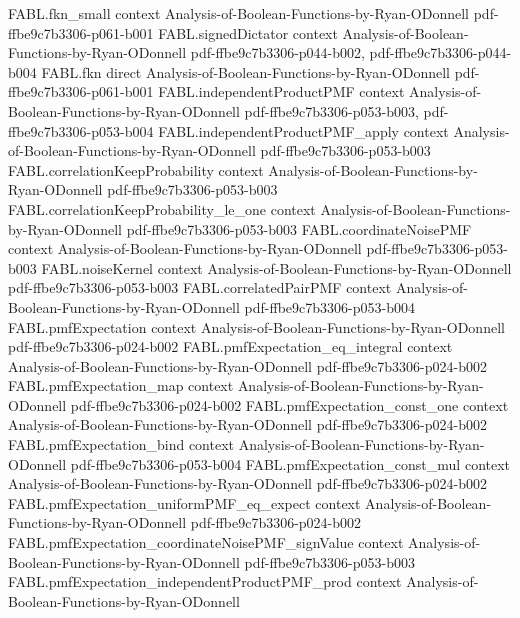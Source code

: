 \begin{theorem}
\proofstep
  {FABL.fkn_small}
  {context}
  {Analysis-of-Boolean-Functions-by-Ryan-ODonnell}
  {pdf-ffbe9c7b3306-p061-b001}
\proofstep
  {FABL.signedDictator}
  {context}
  {Analysis-of-Boolean-Functions-by-Ryan-ODonnell}
  {pdf-ffbe9c7b3306-p044-b002,
    pdf-ffbe9c7b3306-p044-b004}
\proofstep
  {FABL.fkn}
  {direct}
  {Analysis-of-Boolean-Functions-by-Ryan-ODonnell}
  {pdf-ffbe9c7b3306-p061-b001}
\proofstep
  {FABL.independentProductPMF}
  {context}
  {Analysis-of-Boolean-Functions-by-Ryan-ODonnell}
  {pdf-ffbe9c7b3306-p053-b003,
    pdf-ffbe9c7b3306-p053-b004}
\proofstep
  {FABL.independentProductPMF_apply}
  {context}
  {Analysis-of-Boolean-Functions-by-Ryan-ODonnell}
  {pdf-ffbe9c7b3306-p053-b003}
\proofstep
  {FABL.correlationKeepProbability}
  {context}
  {Analysis-of-Boolean-Functions-by-Ryan-ODonnell}
  {pdf-ffbe9c7b3306-p053-b003}
\proofstep
  {FABL.correlationKeepProbability_le_one}
  {context}
  {Analysis-of-Boolean-Functions-by-Ryan-ODonnell}
  {pdf-ffbe9c7b3306-p053-b003}
\proofstep
  {FABL.coordinateNoisePMF}
  {context}
  {Analysis-of-Boolean-Functions-by-Ryan-ODonnell}
  {pdf-ffbe9c7b3306-p053-b003}
\proofstep
  {FABL.noiseKernel}
  {context}
  {Analysis-of-Boolean-Functions-by-Ryan-ODonnell}
  {pdf-ffbe9c7b3306-p053-b003}
\proofstep
  {FABL.correlatedPairPMF}
  {context}
  {Analysis-of-Boolean-Functions-by-Ryan-ODonnell}
  {pdf-ffbe9c7b3306-p053-b004}
\proofstep
  {FABL.pmfExpectation}
  {context}
  {Analysis-of-Boolean-Functions-by-Ryan-ODonnell}
  {pdf-ffbe9c7b3306-p024-b002}
\proofstep
  {FABL.pmfExpectation_eq_integral}
  {context}
  {Analysis-of-Boolean-Functions-by-Ryan-ODonnell}
  {pdf-ffbe9c7b3306-p024-b002}
\proofstep
  {FABL.pmfExpectation_map}
  {context}
  {Analysis-of-Boolean-Functions-by-Ryan-ODonnell}
  {pdf-ffbe9c7b3306-p024-b002}
\proofstep
  {FABL.pmfExpectation_const_one}
  {context}
  {Analysis-of-Boolean-Functions-by-Ryan-ODonnell}
  {pdf-ffbe9c7b3306-p024-b002}
\proofstep
  {FABL.pmfExpectation_bind}
  {context}
  {Analysis-of-Boolean-Functions-by-Ryan-ODonnell}
  {pdf-ffbe9c7b3306-p053-b004}
\proofstep
  {FABL.pmfExpectation_const_mul}
  {context}
  {Analysis-of-Boolean-Functions-by-Ryan-ODonnell}
  {pdf-ffbe9c7b3306-p024-b002}
\proofstep
  {FABL.pmfExpectation_uniformPMF_eq_expect}
  {context}
  {Analysis-of-Boolean-Functions-by-Ryan-ODonnell}
  {pdf-ffbe9c7b3306-p024-b002}
\proofstep
  {FABL.pmfExpectation_coordinateNoisePMF_signValue}
  {context}
  {Analysis-of-Boolean-Functions-by-Ryan-ODonnell}
  {pdf-ffbe9c7b3306-p053-b003}
\proofstep
  {FABL.pmfExpectation_independentProductPMF_prod}
  {context}
  {Analysis-of-Boolean-Functions-by-Ryan-ODonnell}

\end{theorem}
